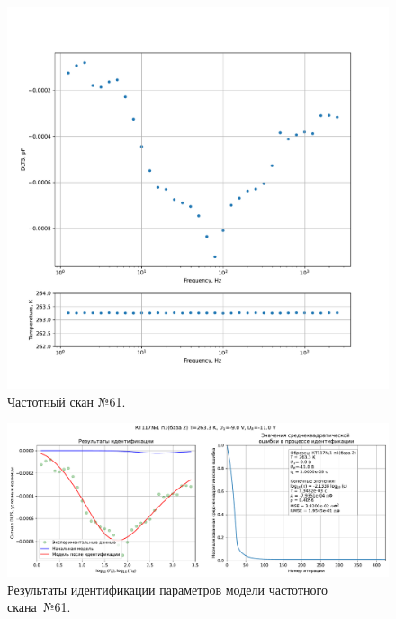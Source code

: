 \begin{figure}[!ht]
    \centering
    \includegraphics[width=1\textwidth]{../plots/КТ117№1_п1(база 2)_2500Гц-1Гц_1пФ_-10С_-9В-11В_20мВ_20мкс_шаг_0,1.pdf}
    \caption{Частотный скан №61.}
    \label{pic:frequency_scan_61}
\end{figure}

\begin{figure}[!ht]
    \centering
    \includegraphics[width=1\textwidth]{../plots/КТ117№1_п1(база 2)_2500Гц-1Гц_1пФ_-10С_-9В-11В_20мВ_20мкс_шаг_0,1_model.pdf}
    \caption{Результаты идентификации параметров модели частотного скана~№61.}
    \label{pic:frequency_scan_model61}
\end{figure}

\pagebreak


